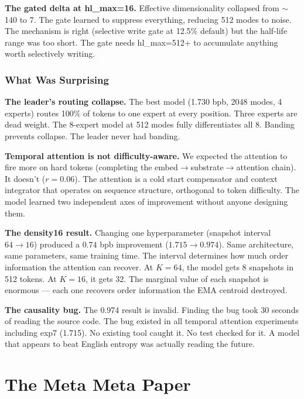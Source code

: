 \documentclass[11pt,a4paper]{report}
\begin{document}
\textbf{The gated delta at hl\_max=16.} Effective dimensionality collapsed from $\sim$140 to 7. The gate learned to suppress everything, reducing 512 modes to noise. The mechanism is right (selective write gate at 12.5\% default) but the half-life range was too short. The gate needs hl\_max=512+ to accumulate anything worth selectively writing.

\section{What Was Surprising}

\textbf{The leader's routing collapse.} The best model (1.730 bpb, 2048 modes, 4 experts) routes 100\% of tokens to one expert at every position. Three experts are dead weight. The 8-expert model at 512 modes fully differentiates all 8. Banding prevents collapse. The leader never had banding.

\textbf{Temporal attention is not difficulty-aware.} We expected the attention to fire more on hard tokens (completing the embed$\to$substrate$\to$attention chain). It doesn't ($r = 0.06$). The attention is a cold start compensator and context integrator that operates on sequence structure, orthogonal to token difficulty. The model learned two independent axes of improvement without anyone designing them.

\textbf{The density16 result.} Changing one hyperparameter (snapshot interval $64 \to 16$) produced a $0.74$ bpb improvement ($1.715 \to 0.974$). Same architecture, same parameters, same training time. The interval determines how much order information the attention can recover. At $K = 64$, the model gets 8 snapshots in 512 tokens. At $K = 16$, it gets 32. The marginal value of each snapshot is enormous --- each one recovers order information the EMA centroid destroyed.

\textbf{The causality bug.} The 0.974 result is invalid. Finding the bug took 30 seconds of reading the source code. The bug existed in all temporal attention experiments including exp7 (1.715). No existing tool caught it. No test checked for it. A model that appears to beat English entropy was actually reading the future.


\part{The Meta Meta Paper}
\end{document}
